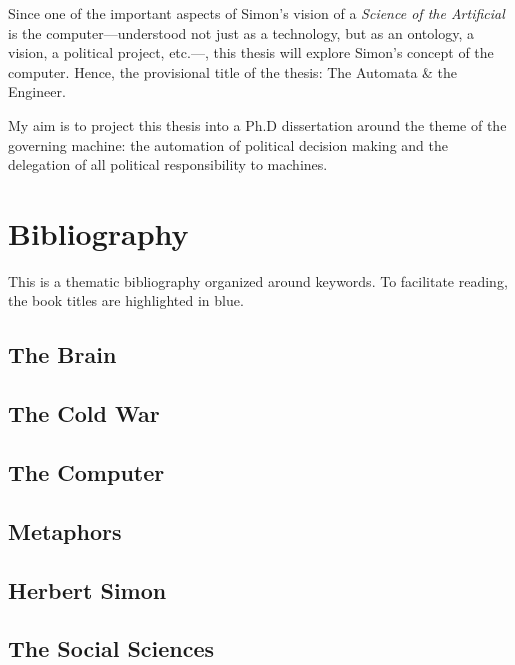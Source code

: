 \documentclass[draft=false, paper=A4,portrait,twoside=true,twocolumn=false,headinclude=false,footinclude=false,fontsize=11,BCOR=15mm,DIV=calc,pagesize=auto,titlepage=firstiscover,mpinclude=true,headings=big,headings=twolinechapter,open=right,chapterprefix=false,headsepline=false,parskip=full]{scrbook}
\begin{document}
Since one of the important aspects of Simon's vision of a \emph{Science of the
Artificial} is the computer---understood not just as a technology, but as an
ontology, a vision, a political project, etc.---, this thesis will explore
Simon's concept of the computer. Hence, the provisional title of the thesis:
The Automata \& the Engineer.

My aim is to project this thesis into a Ph.D dissertation around the theme
of the governing machine: the automation of political decision making and
the delegation of all political responsibility to machines.

\section{Bibliography}
\label{sec:org16d0aae}
This is a thematic bibliography organized around keywords. To facilitate
reading, the book titles are highlighted in blue. 

\nocite{*}
\subsection{The Brain}
\label{sec:org0b34368}
\printbibliography[heading=none,keyword=memoire,keyword=brain]
\subsection{The Cold War}
\label{sec:orgf09a9e7}
\printbibliography[heading=none,keyword=memoire,keyword=cold-war,notkeyword=brain]
\subsection{The Computer}
\label{sec:orgaa4c5db}
\printbibliography[heading=none,keyword=memoire,keyword=computer,notkeyword=brain,notkeyword=cold-war]
\subsection{Metaphors}
\label{sec:orgb81da94}
\printbibliography[heading=none,keyword=memoire,keyword=metaphors,notkeyword=brain,notkeyword=cold-war,notkeyword=computer,notkeyword=cyborg]
\subsection{Herbert Simon}
\label{sec:orgff2982b}
\printbibliography[heading=none,keyword=memoire,keyword=herbert-simon,notkeyword=brain,notkeyword=cold-war,notkeyword=computer,notkeyword=cyborg,notkeyword=metaphors]
\subsection{The Social Sciences}
\label{sec:org726aa82}
\printbibliography[heading=none,keyword=memoire,keyword=social-science,notkeyword=brain,notkeyword=computer,notkeyword=cyborg,notkeyword=metaphors,notkeyword=herbert-simon,notkeyword=cold-war]
\end{document}
